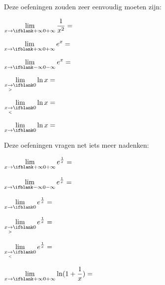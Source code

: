 \documentclass{ximera}
\begin{document}
		Deze oefeningen zouden zeer eenvoudig moeten zijn:
		\begin{exercise} \def\isA{correct}   $\limxi    \frac{1}{x^2}= \;$   \localoefoptions \end{exercise}
		\begin{exercise} \def\isA{correct}   $\limxi    e^x = \;$            \localoefoptions \end{exercise}
		\begin{exercise} \def\isB{correct}   $\limxmi   e^x = \;$            \localoefoptions \end{exercise}
		\begin{exercise} \def\isB{correct}   $\rlimx    \ln x = \;$          \localoefoptions \end{exercise}
		\begin{exercise} \def\isE{correct}   $\llimx    \ln x = \;$          \localoefoptions \end{exercise}
		\begin{exercise} \def\isE{correct}   $\limx     \ln x = \;$          \localoefoptions \end{exercise}
		Deze oefeningen vragen net iets meer nadenken:				
		\begin{exercise} \def\isD{correct}   $\limxi    e^{\frac 1x} = \;$   \localoefoptions \end{exercise}
		\begin{exercise} \def\isC{correct}   $\limxmi   e^{\frac 1x} = \;$   \localoefoptions \end{exercise}
		\begin{exercise} \def\isE{correct}   $\limx     e^{\frac 1x} = \;$   \localoefoptions \end{exercise}
		\begin{exercise} \def\isA{correct}   $\rlimx    e^{\frac 1x} = \;$   \localoefoptions \end{exercise}
		\begin{exercise} \def\isC{correct}   $\llimx    e^{\frac 1x} = \;$   \localoefoptions \end{exercise}
		\begin{exercise} \def\isC{correct}   $\limxi    \ln(1+ \frac 1x) = \;$ \localoefoptions \end{exercise}
		
\end{document}
